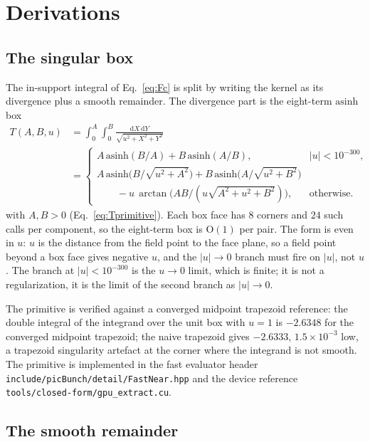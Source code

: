 \section{Derivations}
\label{app:deriv}

\subsection{The singular box}

The in-support integral of Eq.~\eqref{eq:Fc} is split by writing the kernel
as its divergence plus a smooth remainder. The divergence part is the
eight-term $\mathrm{asinh}$ box
\begin{equation}
\begin{split}
T(A,B,u)&=\int_0^A\!\int_0^B\frac{\mathrm{d}X\,\mathrm{d}Y}
{\sqrt{u^2+X^2+Y^2}}\\
&=\begin{cases}
A\,\mathrm{asinh}(B/A)+B\,\mathrm{asinh}(A/B), & |u|<10^{-300},\\[2pt]
A\,\mathrm{asinh}\!\bigl(B/\sqrt{u^2+A^2}\bigr)
+B\,\mathrm{asinh}\!\bigl(A/\sqrt{u^2+B^2}\bigr)\\
\qquad
-u\,\arctan\!\bigl(AB/(u\sqrt{A^2+u^2+B^2})\bigr), & \text{otherwise.}
\end{cases}
\end{split}
\end{equation}
with $A,B>0$ (Eq.~\eqref{eq:Tprimitive}). Each box face has $8$ corners and
$24$ such calls per component, so the eight-term box is $\mathrm{O}(1)$ per
pair. The form is even in $u$: $u$ is the distance from the field point to
the face plane, so a field point beyond a box face gives negative $u$, and
the $|u|\to0$ branch must fire on $|u|$, not $u$. The branch at
$|u|<10^{-300}$ is the $u\to0$ limit, which is finite; it is not a
regularization, it is the limit of the second branch as $|u|\to0$.

The primitive is verified against a converged midpoint trapezoid reference:
the double integral of the integrand over the unit box with $u=1$ is
$-2.6348$ for the converged midpoint trapezoid; the naive trapezoid gives
$-2.6333$, $1.5\times10^{-3}$ low, a trapezoid singularity artefact at the
corner where the integrand is not smooth. The primitive is implemented in
the fast evaluator header \texttt{include/picBunch/detail/FastNear.hpp} and
the device reference
\texttt{tools/closed-form/gpu\allowbreak \_extract.cu}.

\subsection{The smooth remainder}

